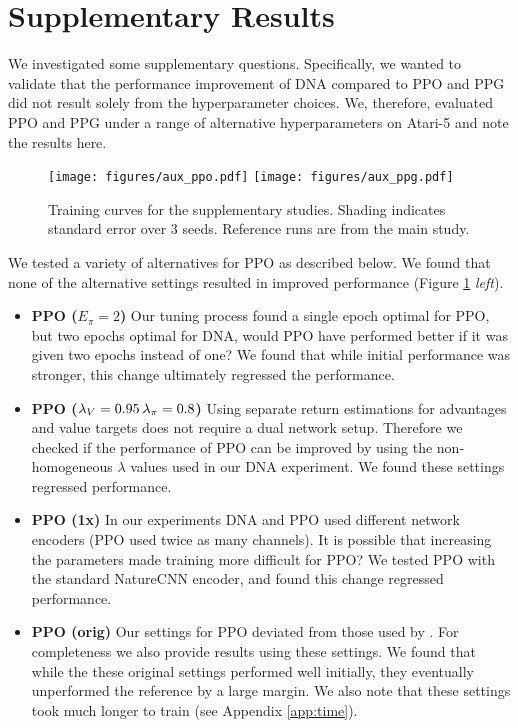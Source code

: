 \documentclass{article}
\begin{document}
\section{Supplementary Results}

We investigated some supplementary questions. Specifically, we wanted to validate that the performance improvement of DNA compared to PPO and PPG did not result solely from the hyperparameter choices. We, therefore, evaluated PPO and PPG under a range of alternative hyperparameters on Atari-5 and note the results here.

\begin{figure}[h]
    \centering
    \texttt{[image: figures/aux\_ppo.pdf]}
    \texttt{[image: figures/aux\_ppg.pdf]}

    \caption{Training curves for the supplementary studies. Shading indicates standard error over 3 seeds. Reference runs are from the main study.}
    \label{fig:aux_results}
\end{figure}

We tested a variety of alternatives for PPO as described below. We found that none of the alternative settings resulted in improved performance (Figure \ref{fig:aux_results} \textit{left}).

\begin{itemize}

\item \textbf{PPO ($E_\pi=2$)}
Our tuning process found a single epoch optimal for PPO, but two epochs optimal for DNA, would PPO have performed better if it was given two epochs instead of one? We found that while initial performance was stronger, this change ultimately regressed the performance.

\item \textbf{PPO ($\lambda_V=0.95 \hspace{0.2em} \lambda_\pi=0.8$)} 
Using separate return estimations for advantages and value targets does not require a dual network setup. Therefore we checked if the performance of PPO can be improved by using the non-homogeneous $\lambda$ values used in our DNA experiment. We found these settings regressed performance.

\item \textbf{PPO (1x)}
In our experiments DNA and PPO used different network encoders (PPO used twice as many channels). It is possible that increasing the parameters made training more difficult for PPO? We tested PPO with the standard NatureCNN encoder, and found this change regressed performance.
     
\item \textbf{PPO (orig)}
Our settings for PPO deviated from those used by \cite{schulman2017proximal}. For completeness we also provide results using these settings. We found that while the these original settings performed well initially, they eventually unperformed the reference by a large margin. We also note that these settings took much longer to train (see Appendix \ref{app:time}).

\end{itemize}
\end{document}
